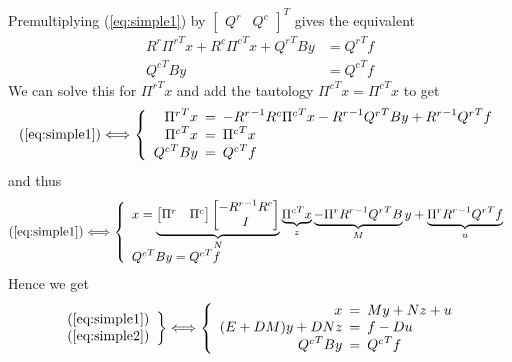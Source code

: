 \documentclass[]{article}
\theoremstyle{definition}
\newcommand{\BIN}{\begin{bmatrix}}
\newcommand{\BOUT}{\end{bmatrix}}
\begin{document}
Premultiplying (\ref{eq:simple1}) by $\BIN Q^r & Q^c \BOUT^T$ gives the equivalent
\begin{align}
  R^r {\Pi^r}^T x + R^c {\Pi^c}^T x + {Q^r}^T B y &= {Q^r}^T f \\
	{Q^c}^T B y &= {Q^c}^T f
\end{align}
We can solve this for ${\Pi^r}^T x$ and add the tautology ${\Pi^c}^T x = {\Pi^c}^T x$ to get
\begin{equation}
	\mathrm{(\ref{eq:simple1})} \Longleftrightarrow \left\{\begin{array}{rcl}
	{\Pi^r}^T x \hspace{-5pt}&=&\hspace{-5pt} -{R^r}^{-1} R^c {\Pi^c}^T x - {R^r}^{-1} {Q^r}^T B y + {R^r}^{-1} {Q^r}^T f\\
	{\Pi^c}^T x \hspace{-5pt}&=&\hspace{-5pt} {\Pi^c}^T x\\
	{Q^c}^T B y \hspace{-5pt}&=&\hspace{-5pt} {Q^c}^T f
	\end{array}\right.
\end{equation}
and thus 
\begin{equation*}
	\mathrm{(\ref{eq:simple1})} \Longleftrightarrow \left\{\begin{array}{l}
	x =\underbrace{\BIN \Pi^r & \Pi^c \BOUT \BIN -{R^r}^{-1} R^c \\ I \BOUT}_{N}
	                                \underbrace{{\Pi^c}^T x}_{z} 
															  \underbrace{- {\Pi^r} {R^r}^{-1} {Q^r}^T B}_M y + \underbrace{\Pi^r {R^r}^{-1} {Q^r}^T f}_u\\
	{Q^c}^T B y = {Q^c}^T f
	\end{array}\right.
\end{equation*}
Hence we get
\begin{equation*}
  \left. \begin{array}{c} (\ref{eq:simple1}) \\ (\ref{eq:simple2}) \end{array} \right\}
	\Longleftrightarrow
	\left\{ \begin{array}{rcl}
	x \hspace{-5pt}&=&\hspace{-5pt} M y + N z + u \\
	(E + D M) y + D N z \hspace{-5pt}&=&\hspace{-5pt} f - D u \\
	{Q^c}^T B y \hspace{-5pt}&=&\hspace{-5pt} {Q^c}^T f
	\end{array} \right.
\end{equation*}
\end{document}
